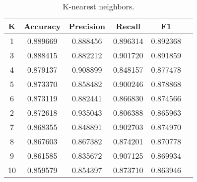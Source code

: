 \begin{appendices}
\begin{table}
\begin{tabular*}{\textwidth}{c @{\extracolsep{\fill}} ccccc}
\toprule
K &  Accuracy &  Precision &    Recall &        F1 \\
\midrule
1  &  0.889669 &   0.888456 &  0.896314 &  0.892368 \\
3  &  0.888415 &   0.882212 &  0.901720 &  0.891859 \\
4  &  0.879137 &   0.908899 &  0.848157 &  0.877478 \\
5  &  0.873370 &   0.858482 &  0.900246 &  0.878868 \\
6  &  0.873119 &   0.882441 &  0.866830 &  0.874566 \\
2  &  0.872618 &   0.935043 &  0.806388 &  0.865963 \\
7  &  0.868355 &   0.848891 &  0.902703 &  0.874970 \\
8  &  0.867603 &   0.867382 &  0.874201 &  0.870778 \\
9  &  0.861585 &   0.835672 &  0.907125 &  0.869934 \\
10 &  0.859579 &   0.854397 &  0.873710 &  0.863946 \\
\bottomrule
\end{tabular*}
\caption{\label{tab:K-nearest neighbors}K-nearest neighbors.}
\end{table}

\end{appendices}

